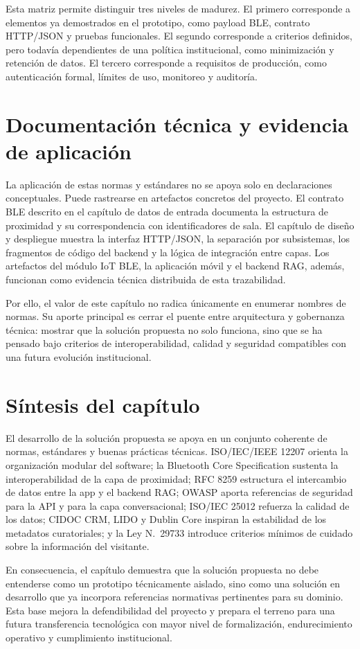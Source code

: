 Esta matriz permite distinguir tres niveles de madurez. El primero corresponde a elementos ya demostrados en el prototipo, como payload BLE, contrato HTTP/JSON y pruebas funcionales. El segundo corresponde a criterios definidos, pero todavía dependientes de una política institucional, como minimización y retención de datos. El tercero corresponde a requisitos de producción, como autenticación formal, límites de uso, monitoreo y auditoría.

\section{Documentación técnica y evidencia de aplicación}

La aplicación de estas normas y estándares no se apoya solo en declaraciones conceptuales. Puede rastrearse en artefactos concretos del proyecto. El contrato BLE descrito en el capítulo de datos de entrada documenta la estructura de proximidad y su correspondencia con identificadores de sala. El capítulo de diseño y despliegue muestra la interfaz HTTP/JSON, la separación por subsistemas, los fragmentos de código del backend y la lógica de integración entre capas. Los artefactos del módulo IoT BLE, la aplicación móvil y el backend RAG, además, funcionan como evidencia técnica distribuida de esta trazabilidad.

Por ello, el valor de este capítulo no radica únicamente en enumerar nombres de normas. Su aporte principal es cerrar el puente entre arquitectura y gobernanza técnica: mostrar que la solución propuesta no solo funciona, sino que se ha pensado bajo criterios de interoperabilidad, calidad y seguridad compatibles con una futura evolución institucional.

\section{Síntesis del capítulo}

El desarrollo de la solución propuesta se apoya en un conjunto coherente de normas, estándares y buenas prácticas técnicas. ISO/IEC/IEEE 12207 orienta la organización modular del software; la Bluetooth Core Specification sustenta la interoperabilidad de la capa de proximidad; RFC 8259 estructura el intercambio de datos entre la app y el backend RAG; OWASP aporta referencias de seguridad para la API y para la capa conversacional; ISO/IEC 25012 refuerza la calidad de los datos; CIDOC CRM, LIDO y Dublin Core inspiran la estabilidad de los metadatos curatoriales; y la Ley N.\ 29733 introduce criterios mínimos de cuidado sobre la información del visitante.

En consecuencia, el capítulo demuestra que la solución propuesta no debe entenderse como un prototipo técnicamente aislado, sino como una solución en desarrollo que ya incorpora referencias normativas pertinentes para su dominio. Esta base mejora la defendibilidad del proyecto y prepara el terreno para una futura transferencia tecnológica con mayor nivel de formalización, endurecimiento operativo y cumplimiento institucional.
